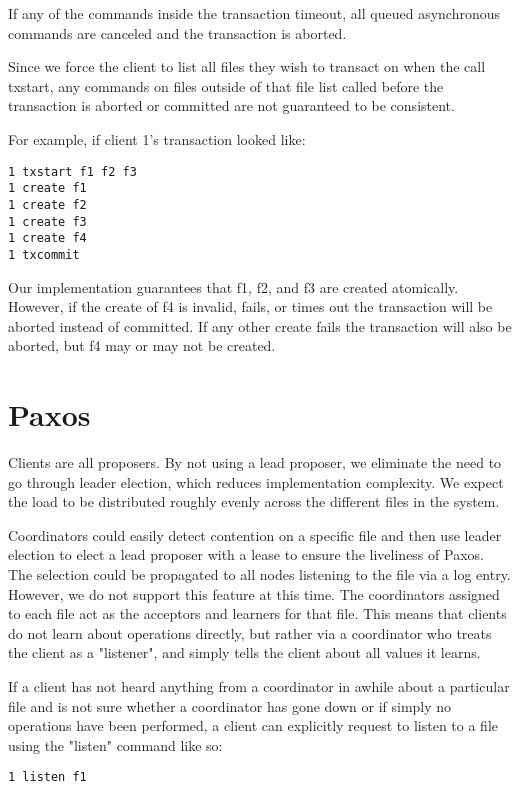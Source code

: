\documentclass[11pt]{article}
\begin{document}
If any of the commands inside the transaction timeout, all queued asynchronous commands are canceled and the transaction is aborted.

Since we force the client to list all files they wish to transact on when the call txstart, any commands on files outside of that file list called before the transaction is aborted or committed are not guaranteed to be consistent.

For example, if client 1's transaction looked like:

\begin{verbatim}
1 txstart f1 f2 f3
1 create f1
1 create f2
1 create f3
1 create f4
1 txcommit
\end{verbatim}

Our implementation guarantees that f1, f2, and f3 are created atomically.
However, if the create of f4 is invalid, fails, or times out the transaction will be aborted instead of committed.
If any other create fails the transaction will also be aborted, but f4 may or may not be created.

\section{Paxos}

Clients are all proposers. By not using a lead proposer, we eliminate the need to go through leader election, which reduces implementation complexity. We expect the load to be distributed roughly evenly across the different files in the system.

Coordinators could easily detect contention on a specific file and then use leader election to elect a lead proposer with a lease to ensure the liveliness of Paxos.
The selection could be propagated to all nodes listening to the file via a log entry.
However, we do not support this feature at this time.
The coordinators assigned to each file act as the acceptors and learners for that file. This means that clients do not learn about operations directly, but rather via a coordinator who treats the client as a "listener", and simply tells the client about all values it learns.

If a client has not heard anything from a coordinator in awhile about a particular file and is not sure whether a coordinator has gone down or if simply no operations have been performed, a client can explicitly request to listen to a file using the "listen" command like so:

\begin{verbatim}
1 listen f1
\end{verbatim}
\end{document}

